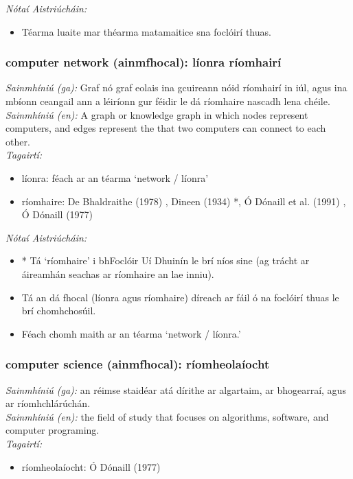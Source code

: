  \noindent \textit{Nótaí Aistriúcháin:}
\begin{itemize}
	\item Téarma luaite mar théarma matamaitice sna foclóirí thuas.
\end{itemize}


\subsubsection*{computer network (ainmfhocal): líonra ríomhairí}
 \noindent \textit{Sainmhíniú (ga):} Graf nó graf eolais ina gcuireann nóid ríomhairí in iúl, agus ina mbíonn ceangail ann a léiríonn gur féidir le dá ríomhaire nascadh lena chéile.
\\
 \noindent \textit{Sainmhíniú (en):} A graph or knowledge graph in which nodes represent computers, and edges represent the that two computers can connect to each other.
\\
 \noindent \textit{Tagairtí:}
\begin{itemize}
	\item líonra: féach ar an téarma `network / líonra'
	\item ríomhaire: De Bhaldraithe (1978) \cite{de-bhaldraithe}, Dineen (1934) \cite{dineen}*, Ó Dónaill et al. (1991) \cite{focloir-beag}, Ó Dónaill (1977) \cite{odonaill}
\end{itemize}

 \noindent \textit{Nótaí Aistriúcháin:}
\begin{itemize}
	\item * Tá `ríomhaire' i bhFoclóir Uí Dhuinín le brí níos sine (ag trácht ar áireamhán seachas ar ríomhaire an lae inniu).
	\item Tá an dá fhocal (líonra agus ríomhaire) díreach ar fáil ó na foclóirí thuas le brí chomhchosúil.
	\item Féach chomh maith ar an téarma `network / líonra.'
\end{itemize}


\subsubsection*{computer science (ainmfhocal): ríomheolaíocht}
 \noindent \textit{Sainmhíniú (ga):} an réimse staidéar atá dírithe ar algartaim, ar bhogearraí, agus ar ríomhchlárúchán.
\\
 \noindent \textit{Sainmhíniú (en):} the field of study that focuses on algorithms, software, and computer programing.
\\
 \noindent \textit{Tagairtí:}
\begin{itemize}
	\item ríomheolaíocht: Ó Dónaill (1977) \cite{odonaill}
\end{itemize}

